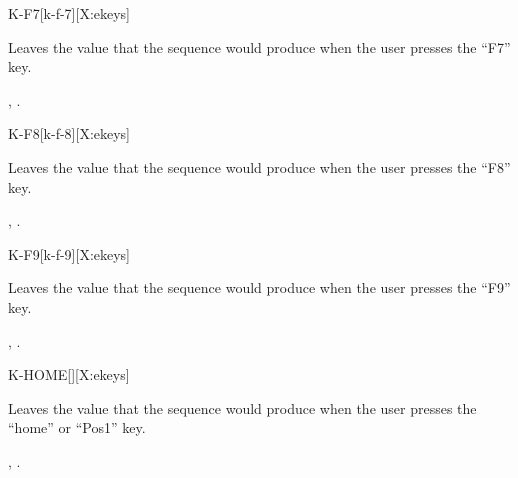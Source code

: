 \begin{worddef*}{}{K-F7}[k-f-7][X:ekeys]
\item {}

	Leaves the value  that the sequence 
	 would produce when the user presses the
	``F7'' key.


\see {},
	.
\end{worddef*}


\begin{worddef*}{}{K-F8}[k-f-8][X:ekeys]
\item {}

	Leaves the value  that the sequence 
	 would produce when the user presses the
	``F8'' key.


\see {},
	.
\end{worddef*}


\begin{worddef*}{}{K-F9}[k-f-9][X:ekeys]
\item {}

	Leaves the value  that the sequence 
	 would produce when the user presses the
	``F9'' key.


\see {},
	.
\end{worddef*}


\begin{worddef*}{}{K-HOME}[][X:ekeys]
\item {}

	Leaves the value  that the sequence 
	 would produce when the user presses the
	``home'' or ``Pos1'' key.


\see {},
	.
\end{worddef*}



